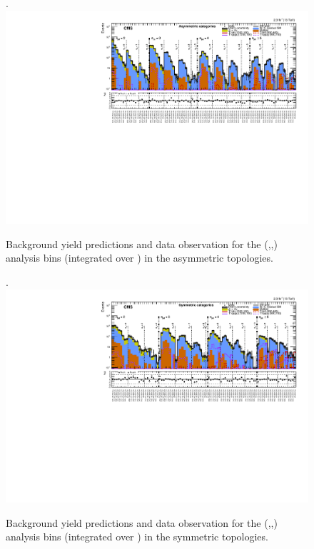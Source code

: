 \clearpage
\begin{landscape}
  \begin{center}
    \begin{figure}[h!]
      \caption{Background yield predictions and data observation for the (\njet,\nb,\scalht) analysis bins (integrated over \MHT) in the asymmetric topologies. \label{fig:summaryPlot_Asymmetric}}.
      \includegraphics[width=0.8\linewidth]{figures/postFitResults/summaryPlots/summaryPlot_Asymmetric_prefit_overlay_fit_b}
    \end{figure}
  \end{center}
\end{landscape}

\clearpage
\begin{landscape}
  \begin{center}
    \begin{figure}[h!]
      \caption{Background yield predictions and data observation for the (\njet,\nb,\scalht) analysis bins (integrated over \MHT) in the symmetric topologies. \label{fig:summaryPlot_Symmetric}}.
      \includegraphics[width=0.8\linewidth]{figures/postFitResults/summaryPlots/summaryPlot_Symmetric_prefit_overlay_fit_b}
    \end{figure}
  \end{center}
\end{landscape}





